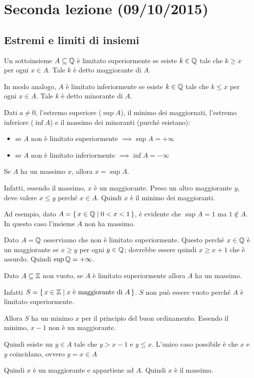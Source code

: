 \chapter{Seconda lezione (09/10/2015)}

\section{Estremi e limiti di insiemi}

\begin{definition}
Un sottoinsieme $A \subseteq \mathbb Q$ è limitato superiormente se esiste $k \in \mathbb Q$ tale che $k \ge x$ per ogni $x \in A$. Tale $k$ è detto maggiorante di $A$. 

In modo analogo, $A$ è limitato inferiormente se esiste $k \in \mathbb Q$ tale che $k \le x$ per ogni $x \in A$. Tale $k$ è detto minorante di $A$.
\end{definition}

Dati $a \neq 0$, l'estremo superiore ($\sup A$), il minimo dei maggiornati, l'estremo inferiore ($\inf A$) e il massimo dei minoranti (purché esistano):
\begin{itemize}
\item se $A$ non è limitato superiormente $ \implies \sup A = + \infty$
\item se $A$ non è limitato inferiormente $ \implies \inf A = - \infty$
\end{itemize}

\begin{remark}
Se $A$ ha un massimo $x$, allora $x = \sup A$.

Infatti, essendo il massimo, $x$ è un maggiorante. Preso un altro maggiorante $y$, deve valere $x \le y$ perché $x \in A$. Quindi $x$ è il minimo dei maggioranti.
\end{remark}

Ad esempio, dato $A = \set{x \in \mathbb Q| 0 < x < 1}$, è evidente che $\sup A = 1$ ma $1 \notin A$. In questo caso l'insieme $A$ non ha massimo.

\begin{example}
Dato $A = \mathbb Q$ osserviamo che non è limitato superiormente. Questo perché $x \in \mathbb Q$ è un maggiorante se $x \ge y$ per ogni $y \in \mathbb Q$; dovrebbe essere quindi $x \ge x + 1$ che è assurdo. Quindi $\sup \mathbb Q = +\infty$.
\end{example}

\begin{example}
Dato $A \subseteq \mathbb Z$ non vuoto, se $A$ è limitato superiormente allora $A$ ha un massimo.

Infatti $S = \set{x \in \mathbb Z| x \text{ è maggiorante di } A}$. $S$ non può essere vuoto perché $A$ è limitato superiormente.

Allora $S$ ha un minimo $x$ per il principio del buon ordinamento. Essendo il minimo, $x-1$ non è un maggiorante.

Quindi esiste un $y \in A$ tale che $y > x-1$ e $y \le x$. L'unico caso possibile è che $x$ e $y$ coincidano, ovvero $y = x \in A$

Quindi $x$ è un maggiorante e appartiene ad $A$. Quindi $x$ è il massimo.
\end{example}

